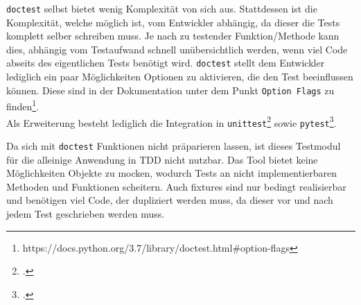 \lstinline{doctest} selbst bietet wenig Komplexität von sich aus. Stattdessen
ist die Komplexität, welche möglich ist, vom Entwickler abhängig, da
dieser die Tests komplett selber schreiben muss. Je nach zu testender
Funktion/Methode kann dies, abhängig vom Testaufwand schnell unübersichtlich
werden, wenn viel Code abseits des eigentlichen Tests benötigt wird.
\lstinline{doctest} stellt dem Entwickler lediglich ein paar Möglichkeiten
Optionen zu aktivieren, die den Test beeinflussen können. Diese sind in der
Dokumentation unter dem Punkt \lstinline{Option Flags} zu
finden\footnote{https://docs.python.org/3.7/library/doctest.html\#option-flags}.
\\
Als Erweiterung besteht lediglich die Integration in
\lstinline{unittest}\footcite{docs.python:doctest} sowie
\lstinline{pytest}\footcite{docs.pytest.org:4.4}.
\newline

Da sich mit \lstinline{doctest} Funktionen nicht präparieren lassen, ist dieses
Testmodul für die alleinige Anwendung in TDD nicht nutzbar. Das Tool bietet
keine Möglichkeiten Objekte zu \gls{mock}en, wodurch Tests an nicht
implementierbaren Methoden und Funktionen scheitern. Auch \Glspl{fixture} sind
nur bedingt realisierbar und benötigen viel Code, der dupliziert werden muss, da
dieser vor und nach jedem Test geschrieben werden muss.